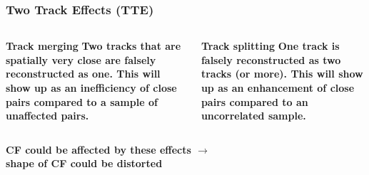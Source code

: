 \documentclass[dvipsnames] {beamer}
\begin{document}
\begin{frame}
  \frametitle{Two Track Effects (TTE)}
  \begin{columns}
    \begin{block}{\bf \centering Track merging}
      { \bf
        Two tracks that are spatially very close are falsely reconstructed as one.
        This will show up as an inefficiency of close pairs compared to a sample of unaffected pairs.
      }
    \end{block}
    \begin{block}{\bf \centering Track splitting}
      { \bf
        One track is falsely reconstructed as two tracks (or more).
        This will show up as an enhancement of close pairs compared to an uncorrelated sample.
      }
    \end{block}
  \end{columns}
  \begin{columns}
    \begin{block}{}
      {\bf 
        {\color{blue} CF could be affected by these effects} $\rightarrow$ \\
        {\color{red} shape of CF could be distorted}
      }
    \end{block}
  \end{columns}
\end{frame}
\end{document}
